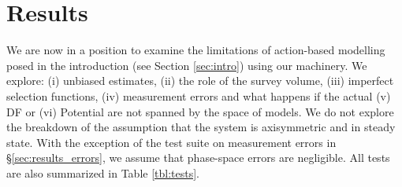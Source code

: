 \section{Results} \label{sec:results}

We are now in a position to examine the limitations of action-based modelling posed in the introduction (see Section \ref{sec:intro}) using our \RM{} machinery. We explore: (i) unbiased estimates, (ii) the role of the survey volume, (iii) imperfect selection functions, (iv) measurement errors and what happens if the actual (v) DF or (vi) Potential are not spanned by the space of models. We do not explore the breakdown of the assumption that the system is axisymmetric and
in steady state. With the exception of the test suite on measurement errors in \S\ref{sec:results_errors}, we assume that phase-space errors are negligible. All tests are also summarized in Table \ref{tbl:tests}. 




